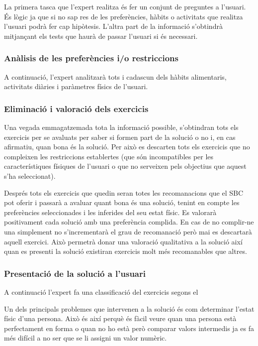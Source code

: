 \documentclass[a4paper, 12pt, UTF8]{article}
\begin{document}
La primera tasca que l'expert realitza és fer un conjunt de preguntes a l'usuari. És lògic ja que si no sap res de les preferències, hàbits o activitats que realitza l'usuari podrà fer cap hipòtesis. L'altra part de la informació s'obtindrà mitjançant els tests que haurà de passar l'usuari si és necessari. 

\subsubsection*{Anàlisis de les preferències i/o restriccions}

A continuació, l'expert analitzarà tots i cadascun dels hàbits alimentaris, activitats diàries i paràmetres físics de l'usuari.

\subsubsection*{Eliminació i valoració dels exercicis}

Una vegada emmagatzemada tota la informació possible, s'obtindran tots els exercicis per se avaluats per saber si formen part de la solució o no i, en cas afirmatiu, quan bona és la solució. Per això es descarten tots els exercicis que no compleixen les restriccions establertes (que són incompatibles per les característiques físiques de l'usuari o que no serveixen pels objectius que aquest s'ha seleccionat).

Després tots els exercicis que quedin seran totes les recomanacions que el SBC pot oferir i passarà a avaluar quant bona és una solució, tenint en compte les preferències seleccionades i les inferides del seu estat físic. Es valorarà positivament cada solució amb una preferència complida. En cas de no complir-ne una simplement no s'incrementarà el grau de recomanació però mai es descartarà aquell exercici. Això permetrà donar una valoració qualitativa a la solució així quan es presenti la solució existiran exercicis molt més recomanables que altres.

\subsubsection*{Presentació de la solució a l'usuari}

A continuació l'expert fa una classificació del exercicis segons el 


Un dels principals problemes que intervenen a la solució és com determinar l'estat físic d'una persona. Això és així perquè és fàcil veure quan una persona està perfectament en forma o quan no ho està però comparar valors intermedis ja es fa més difícil a no ser que se li assigni un valor numèric.
\end{document}
